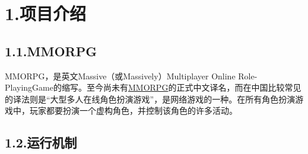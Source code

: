 \documentclass{article}
\begin{document}
\begin{mdtoc}
\begin{mdtocblock}
\begin{mdtocblock}


\end{mdtocblock}%


\begin{mdtocblock}%



\end{mdtocblock}%
\end{mdtocblock}%
\end{mdtoc}%

\section{1.\hspace*{0.5em}项目介绍}\label{1}%

\subsection{1.1.\hspace*{0.5em}MMORPG}\label{12}%

\noindent{}MMORPG，是英文Massive（或Massively）Multiplayer Online Role-PlayingGame的缩写。至今尚未有\href{https://baike.baidu.com/item/MMORPG}{MMORPG}的正式中文译名，而在中国比较常见的译法则是\textquotedblleft{}大型多人在线角色扮演游戏\textquotedblright{}，是网络游戏的一种。在所有角色扮演游戏中，玩家都要扮演一个虚构角色，并控制该角色的许多活动。%

\subsection{1.2.\hspace*{0.5em}运行机制}\label{13}%
\end{document}
